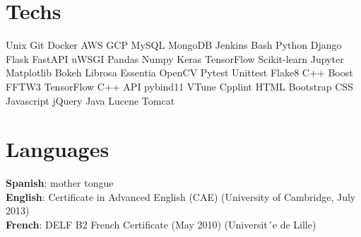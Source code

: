 \documentclass[]{deedy-resume-openfont}
\begin{document}
\begin{minipage}[t]{0.30\textwidth}
\section{Techs}
Unix \textbullet{}   Git \textbullet{} Docker \textbullet{} AWS \textbullet{} GCP \textbullet{} MySQL \textbullet{} MongoDB \textbullet{} Jenkins \textbullet{} Bash
\textbullet{} Python \textbullet{} Django \textbullet{} Flask \textbullet{} FastAPI \textbullet{} uWSGI
\textbullet{} Pandas \textbullet{} Numpy \textbullet{} Keras \textbullet{} TensorFlow
\textbullet{} Scikit-learn \textbullet{} Jupyter \textbullet{} Matplotlib
\textbullet{} Bokeh \textbullet{} Librosa \textbullet{} Essentia
\textbullet{} OpenCV
\textbullet{} Pytest \textbullet{} Unittest \textbullet{} Flake8
\textbullet{} C++ \textbullet{} Boost \textbullet{} FFTW3 \textbullet{} TensorFlow C++ API \textbullet{} pybind11 \textbullet{} VTune \textbullet{} Cpplint \textbullet{} HTML \textbullet{} Bootstrap \textbullet{} CSS \textbullet{} Javascript \textbullet{} jQuery \textbullet{} Java \textbullet{} Lucene \textbullet{} Tomcat

\vspace{0.5cm}
\section{Languages}
{\bf Spanish}: mother tongue \\
{\bf English}: Certificate in Advanced English (CAE) (University of Cambridge, July 2013) \\
{\bf French}: DELF B2 French Certificate (May 2010)
(Universit´e de Lille) \\

\sectionsep

%
%

\end{minipage} 
\hfill
\end{document}
